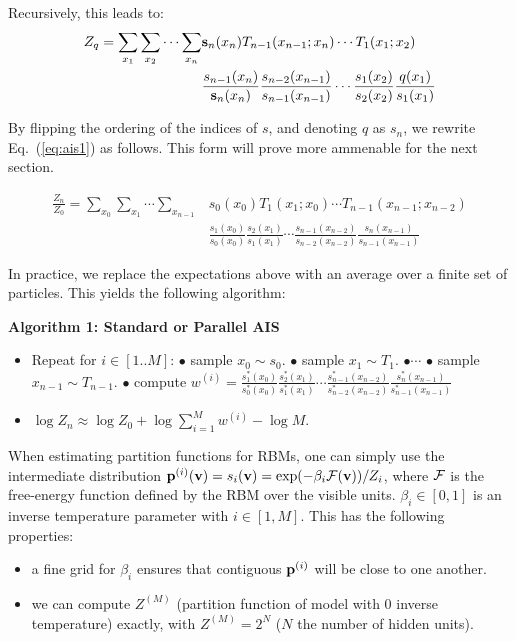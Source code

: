 \documentclass{article}
\begin{document}
Recursively, this leads to:
\begin{align}
    \label{eq:ais1}
    Z_q = \sum_{x_1} \sum_{x_2} \cdots \sum_{x_n}
    & \mathbf{s}_n(x_n) T_{n-1}(x_{n-1}; x_n) \cdots T_1(x_1; x_2) \\ \nonumber
    & \frac{s_{n-1}(x_n)}{\mathbf{s}_n(x_n)} 
      \frac{s_{n-2}(x_{n-1})}{s_{n-1}(x_{n-1})} \cdots
      \frac{s_1(x_2)}{s_2(x_2)}
      \frac{q(x_1)}{s_1(x_1)}
\end{align}
\bigskip

By flipping the ordering of the indices of $s$, and denoting $q$ as $s_n$, we
rewrite Eq.~(\ref{eq:ais1}) as follows. This form will prove more ammenable for
the next section.

\begin{align}
    \frac{Z_n}{Z_0} = \sum_{x_0} \sum_{x_1} \cdots \sum_{x_{n-1}}
    & s_0(x_0) T_1(x_1; x_0) \cdots T_{n-1}(x_{n-1}; x_{n-2}) \\ \nonumber
    & \frac{s_1(x_0)}{s_0(x_0)} 
      \frac{s_2(x_1)}{s_1(x_1)} \cdots
      \frac{s_{n-1}(x_{n-2})}{s_{n-2}(x_{n-2})}
      \frac{s_n(x_{n-1})}{s_{n-1}(x_{n-1})}
\end{align}

\bigskip
In practice, we replace the expectations above with an average over a finite
set of particles. This yields the following algorithm:
\bigskip

{\bf Algorithm 1: Standard or Parallel AIS}
\begin{itemize}
    \item Repeat for $i \in [1..M]$:
    \subitem $\bullet$ sample $x_0 \sim s_0$.
    \subitem $\bullet$ sample $x_1 \sim T_1$.
    \subitem $\bullet \cdots$
    \subitem $\bullet$ sample $x_{n-1} \sim T_{n-1}$.
    \subitem $\bullet$ compute 
    $w^{(i)} = \frac{s_1^*(x_0)}{s_0^*(x_0)} 
               \frac{s_2^*(x_1)}{s_1^*(x_1)} \cdots
               \frac{s_{n-1}^*(x_{n-2})}{s_{n-2}^*(x_{n-2})}
               \frac{s_n^*(x_{n-1})}{s_{n-1}^*(x_{n-1})}$
    \item $\log Z_n \approx \log Z_0 + \log \sum_{i=1}^M w^{(i)} - \log M$.
\end{itemize}
\bigskip


\bigskip
When estimating partition functions for RBMs, one can simply use the
intermediate distribution 
$\mathbf{p}^{(i)}(\mathbf{v}) = s_i(\mathbf{v}) = \exp(- \beta_i \mathbf{\mathcal{F}}(\mathbf{v})) / Z_i $, 
where $\mathbf{\mathcal{F}}$ is the free-energy function defined by the RBM over the visible
units. $\beta_i \in [0,1]$ is an inverse temperature
parameter with $i \in [1,M]$. 
This has the following properties: 
\begin{itemize}
    \item a fine grid for $\beta_i$ ensures that contiguous $\mathbf{p}^{(i)}$ will be close to one another.
    \item we can compute $Z^{(M)}$ (partition function of model with 0 inverse
        temperature) exactly, with $Z^{(M)} = 2^N$ ($N$ the number of hidden units).
\end{itemize}
\end{document}
